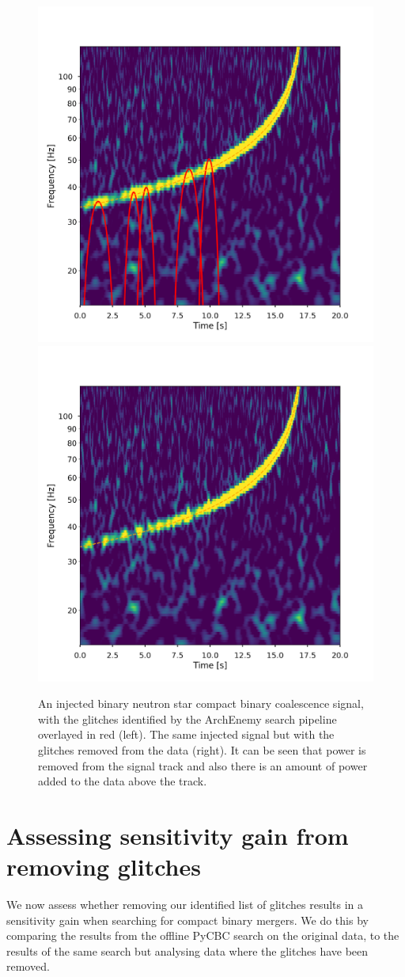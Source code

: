 \begin{figure}
  \centering
  \begin{minipage}[t]{1.0\linewidth}
    \includegraphics[width=0.49\linewidth]{images/4_archenemy/Section3/3.8/L1_loud_Original.pdf}
    \hspace{0.02\linewidth}
    \includegraphics[width=0.49\linewidth]{images/4_archenemy/Section3/3.8/L1_loud_Subtracted.pdf}
  \end{minipage}
    \caption{An injected binary neutron star compact binary coalescence \gw{} signal, with the \scl{} glitches identified by the ArchEnemy search pipeline overlayed in red (left). The same injected signal but with the \scl{} glitches removed from the data (right). It can be seen that power is removed from the signal track and also there is an amount of power added to the data above the track.}
    \label{4:fig:loud_inj}
\end{figure}

\section{\label{4:sec:results}Assessing sensitivity gain from removing \scl{} glitches}

We now assess whether removing our identified list of \scl{} glitches results in a sensitivity gain when searching for compact binary mergers. We do this by comparing the results from the offline PyCBC search on the original data, to the results of the same search but analysing data where the glitches have been removed.

